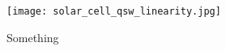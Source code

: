 \documentclass[onecolumn]{aa}
\newcommand{\Oldthorlabs}{SM05PD1B}
\begin{document}
\begin{figure}[!ht]
\begin{center}
\texttt{[image: solar\_cell\_qsw\_linearity.jpg]}
\end{center}
\caption[]{Something}
\label{fig:SCqswlinearity}
\end{figure}

%
%
%


%
%
%
%

\end{document}
